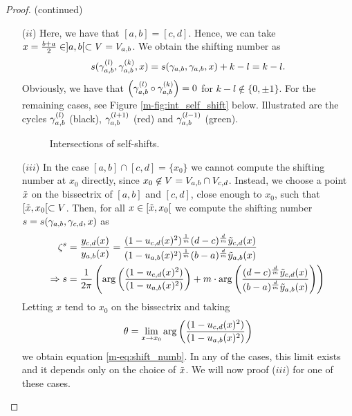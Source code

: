 \documentclass[main.tex]{subfiles}
\begin{document}
   \begin{proof}(continued)
   \begin{itemize}
    \item[($ii$)] Here, we have that $[a,b] = [c,d]$. Hence, we can take $x = \frac{b+a}{2} \in  ]a,b[  \subset V = V_{a,b}$. We obtain the shifting number as
    \begin{align*}
      s(\gamma_{a,b}^{(l)},\gamma_{a,b}^{(k)},x) = s(\gamma_{a,b},\gamma_{a,b},x) + k - l = k - l.
    \end{align*}
    Obviously, we have that $\left(\gamma_{a,b}^{(l)} \circ \gamma_{a,b}^{(k)}\right) = 0$ for $k - l \not\in \{ 0, \pm 1\}$. For the remaining cases, see Figure \ref{m-fig:int_self_shift} below.
    Illustrated are the cycles $\gamma_{a,b}^{(l)}$ (black),
      $\gamma_{a,b}^{(l+1)}$ (red) and $\gamma_{a,b}^{(l-1)}$ (green).
    \begin{figure}[H]
      \begin{center}
   
      \end{center}
    \caption{Intersections of self-shifts.}
    \label{fig:int_self_shift}
\end{figure}
   \item[($iii$)]
  In the case $[a,b] \cap [c,d] = \{ x_0 \}$ we cannot compute the shifting number at $x_0$ directly, since $x_0 \not\in V = V_{a,b} \cap V_{c,d}$. Instead, we choose a point $\tilde{x}$ on the bissectrix of
  $[a,b]$ and $[c,d]$, close enough to $x_0$, such that $[\tilde{x},x_0[  \subset  V$. Then, for all $x \in [\tilde{x},x_0[$ we compute the shifting number $s = s(\gamma_{a,b},\gamma_{c,d},x)$ as
  \begin{align}
   \zeta^s & = \frac{y_{c,d}(x)}{y_{a,b}(x)} = \frac{(1- u_{c,d}(x)^2)^{\frac{1}{m}} (d-c)^{\frac{d}{m}}\tilde{y}_{c,d}(x) }{(1-u_{a,b}(x)^2)^{\frac{1}{m}} (b-a)^{\frac{d}{m}}\tilde{y}_{a,b}(x)} \\
   \Rightarrow  s & = \frac{1}{2\pi} \left( \arg \left( \frac{(1- u_{c,d}(x)^2)}{(1-u_{a,b}(x)^2)} \right) + m \cdot \arg \left( \frac{(d-c)^{\frac{d}{m}} \tilde{y}_{c,d}(x)}{(b-a)^{\frac{d}{m}}
   \tilde{y}_{a,b}(x)} \right) \right)
  \end{align}
  Letting $x$ tend to $x_0$ on the bissectrix and taking
  \begin{align}
   \theta = \lim_{x \rightarrow x_0} \arg \left( \frac{(1- u_{c,d}(x)^2)}{(1-u_{a,b}(x)^2)} \right)
  \end{align}
  we obtain equation \eqref{m-eq:shift_numb}. In any of the cases, this limit exists and it depends only on the choice of $\tilde{x}$. We will now proof ($iii$) for one of these cases.



\end{itemize}
\end{proof}
\end{document}
